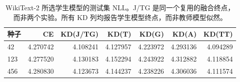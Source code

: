 \begin{table}[!t]\centering
\begin{tabular}{lrrrrrr}
\toprule
种子 & CE & KD(J/TG) & KD(T) & KD(G) & KD(A) & KD(TT) \\
\midrule
42 & 4.270742 & 4.108241 & 4.127957 & 4.223972 & 4.293136 & 4.094289 \\
123 & 4.277520 & 4.130183 & 4.152294 & 4.243922 & 4.312882 & 4.118854 \\
456 & 4.280830 & 4.123673 & 4.144237 & 4.238226 & 4.306036 & 4.111574 \\
\bottomrule
\end{tabular}
\caption{WikiText-2 所选学生模型的测试集 NLL。J/TG 是同一个复用的融合终点，而非两个实验。所有 KD 列均报告学生模型终点，而非教师模型似然。}\label{tab:wt2_endpoints}
\end{table}
